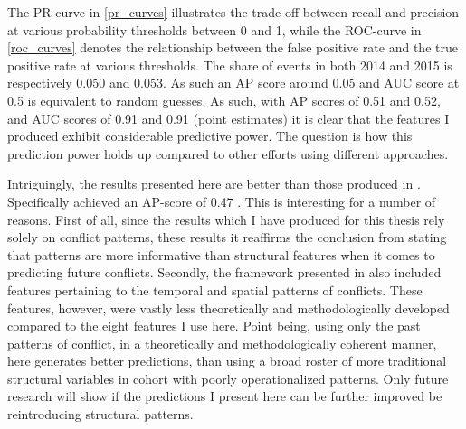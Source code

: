 \documentclass[a4paper]{article}
\begin{document}
The PR-curve in \autoref{pr_curves} illustrates the trade-off between recall and precision at various probability thresholds between 0 and 1, while the ROC-curve in \autoref{roc_curves} denotes the relationship between the false positive rate and the true positive rate at various thresholds. The share of events in both 2014 and 2015 is respectively 0.050 and 0.053. As such an AP score around 0.05 and AUC score at 0.5 is equivalent to random guesses. As such, with AP scores of 0.51 and 0.52, and AUC scores of 0.91 and 0.91 (point estimates) it is clear that the features I produced exhibit considerable predictive power. The question is how this prediction power holds up compared to other efforts using different approaches.\par

Intriguingly, the results presented here are better than those produced in \cite{Maase}. Specifically \cite{Maase} achieved an AP-score of 0.47 \cite[14]{Maase}. This is interesting for a number of reasons. First of all, since the results which I have produced for this thesis rely solely on conflict patterns, these results it reaffirms the conclusion from \cite{Maase} stating that patterns are more informative than structural features when it comes to predicting future conflicts. Secondly, the framework presented in \cite{Maase} also included features pertaining to the temporal and spatial patterns of conflicts. These features, however, were vastly less theoretically and methodologically developed compared to the eight features I use here. Point being, using only the past patterns of conflict, in a theoretically and methodologically coherent manner, here generates better predictions, than using a broad roster of more traditional structural variables in cohort with poorly operationalized patterns. Only future research will show if the predictions I present here can be further improved be reintroducing structural patterns.\par
\end{document}
